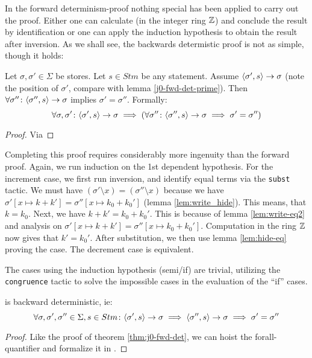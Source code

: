 In the forward determinism-proof nothing special has been applied to
carry out the proof. Either one can calculate (in the integer ring
$\mathbb{Z}$) and conclude the result by identification or one can apply the
induction hypothesis to obtain the result after inversion. As we shall
see, the backwards determistic proof is not as simple, though it
holds:

\begin{lem}
  Let $\sigma, \sigma' \in \Sigma$ be stores. Let $s \in Stm$ be any
  statement. Assume $\langle \sigma', s \rangle -> \sigma$ (note the position of
  $\sigma'$, compare with lemma \eqref{j0-fwd-det-prime}). Then
  $\forall \sigma'' \colon \langle \sigma'', s \rangle -> \sigma$ implies $\sigma' =
  \sigma''$. Formally:
  \begin{equation*}
    \forall \sigma, \sigma' \colon \langle \sigma', s \rangle -> \sigma \implies
    (\forall \sigma'' \colon \langle \sigma'', s \rangle -> \sigma \implies \sigma'
    = \sigma'')
  \end{equation*}
\end{lem}
\begin{proof}
  Via \coq{}
\end{proof}

Completing this proof requires considerably more ingenuity than the
forward proof. Again, we run induction on the 1st dependent
hypothesis. For the increment case, we first run inversion, and
identify equal terms via the \texttt{subst} tactic. We must have
$(\sigma' \setminus x) = (\sigma'' \setminus x)$ because we have
$\sigma'[x \mapsto k + k'] = \sigma''[x \mapsto k_0 + k_0']$ (lemma
\eqref{lem:write_hide}). This means, that $k = k_0$. Next, we have $k
+ k' = k_0 + k_0'$. This is because of lemma \eqref{lem:write-eq2} and
analysis on $\sigma'[x \mapsto k + k'] = \sigma''[x \mapsto k_0 +
k_0']$. Computation in the ring $\mathbb{Z}$ now gives that $k' =
k_0'$. After substitution, we then use lemma \eqref{lem:hide-eq}
proving the case. The decrement case is equivalent.

The cases using the induction hypothesis (semi/if) are trivial,
utilizing the \texttt{congruence} tactic to solve the impossible cases
in the evaluation of the ``if'' cases.

\begin{thm}
  \janusz{} is backward deterministic, ie:
  \begin{equation*}
    \forall \sigma, \sigma', \sigma'' \in \Sigma, s \in Stm \colon
    \langle \sigma', s \rangle -> \sigma \implies \langle \sigma'', s \rangle -> \sigma \implies \sigma' = \sigma''
  \end{equation*}
\end{thm}
\begin{proof}
  Like the proof of theorem \eqref{thm:j0-fwd-det}, we can hoist the
  forall-quantifier and formalize it in \coq{}.
\end{proof}

